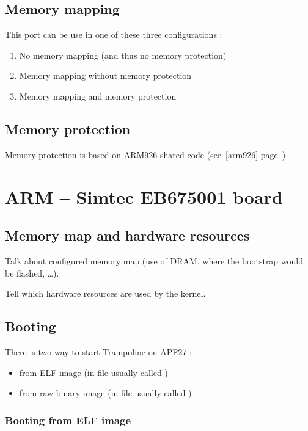 \subsection{Memory mapping}

This port can be use in one of these three configurations :
\begin{enumerate}
\item No memory mapping (and thus no memory protection)
\item Memory mapping without memory protection
\item Memory mapping and memory protection
\end{enumerate}

\subsection{Memory protection}

Memory protection is based on ARM926 shared code (see~\ref{arm926} page~\pageref{arm926})

\section{ARM -- Simtec EB675001 board}

\subsection{Memory map and hardware resources}

Talk about configured memory map (use of DRAM, where the bootstrap would be flashed, \ldots).

Tell which hardware resources are used by the kernel.

\subsection{Booting}

There is two way to start Trampoline on APF27 :
\begin{itemize}
\item from ELF image (in file usually called )
\item from raw binary image (in file usually called )
\end{itemize}

\subsubsection{Booting from ELF image}

